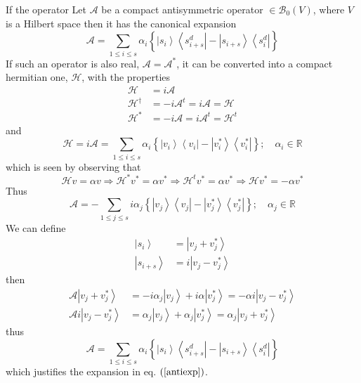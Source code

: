 \documentclass[aps,preprint]{revtex4}%
\begin{document}
If the operator Let $\mathcal{A}$ be a compact antisymmetric operator
$\in\mathcal{B}_{0}\left(  V\right)  $, where $V$ is a Hilbert space then it
has the canonical expansion
\begin{equation}
\mathcal{A}=\sum_{1\leq i\leq s}\alpha_{i}\left\{  \left\vert s_{i}%
\right\rangle \left\langle s_{i+s}^{d}\right\vert -\left\vert s_{i+s}%
\right\rangle \left\langle s_{i}^{d}\right\vert \right\}  \label{antiexp}%
\end{equation}
If such an operator is also real, $\mathcal{A}=\mathcal{A}^{\ast}$, it can be
converted into a compact hermitian one, $\mathcal{H}$, with the properties
\begin{align}
\mathcal{H}  & =i\mathcal{A}\nonumber\\
\mathcal{H}^{\dagger}  & =-i\mathcal{A}^{t}=i\mathcal{A}=\mathcal{H}%
\nonumber\\
\mathcal{H}^{\ast}  & =-i\mathcal{A}=i\mathcal{A}^{t}=\mathcal{H}^{t}%
\end{align}
and
\begin{equation}
\mathcal{H}=i\mathcal{A}=\sum_{1\leq i\leq s}\alpha_{i}\left\{  \left\vert
v_{i}\right\rangle \left\langle v_{i}\right\vert -\left\vert v_{i}^{\ast
}\right\rangle \left\langle v_{i}^{\ast}\right\vert \right\}  ;\quad\alpha
_{i}\in\mathbb{R}%
\end{equation}
which is seen by observing that
\begin{equation}
\mathcal{H}v=\alpha v\Rightarrow\mathcal{H}^{\ast}v^{\ast}=\alpha v^{\ast
}\Rightarrow\mathcal{H}^{t}v^{\ast}=\alpha v^{\ast}\Rightarrow\mathcal{H}%
v^{\ast}=-\alpha v^{\ast}%
\end{equation}
Thus
\begin{equation}
\mathcal{A}=-\sum_{1\leq j\leq s}i\alpha_{j}\left\{  \left\vert v_{j}%
\right\rangle \left\langle v_{j}\right\vert -\left\vert v_{j}^{\ast
}\right\rangle \left\langle v_{j}^{\ast}\right\vert \right\}  ;\quad\alpha
_{j}\in\mathbb{R}%
\end{equation}
We can define
\begin{align}
\left\vert s_{i}\right\rangle  & =\left\vert v_{j}+v_{j}^{\ast}\right\rangle
\nonumber\\
\left\vert s_{i+s}\right\rangle  & =i\left\vert v_{j}-v_{j}^{\ast
}\right\rangle
\end{align}
then
\begin{align}
\mathcal{A}\left\vert v_{j}+v_{j}^{\ast}\right\rangle  & =-i\alpha
_{j}\left\vert v_{j}\right\rangle +i\alpha\left\vert v_{j}^{\ast}\right\rangle
=-\alpha i\left\vert v_{j}-v_{j}^{\ast}\right\rangle \nonumber\\
\mathcal{A}i\left\vert v_{j}-v_{j}^{\ast}\right\rangle  & =\alpha
_{j}\left\vert v_{j}\right\rangle +\alpha_{j}\left\vert v_{j}^{\ast
}\right\rangle =\alpha_{j}\left\vert v_{j}+v_{j}^{\ast}\right\rangle
\end{align}
thus
\begin{equation}
\mathcal{A=}\sum_{1\leq i\leq s}\alpha_{i}\left\{  \left\vert s_{i}%
\right\rangle \left\langle s_{i+s}^{d}\right\vert -\left\vert s_{i+s}%
\right\rangle \left\langle s_{i}^{d}\right\vert \right\}
\end{equation}
which justifies the expansion in eq. $\left(  \ref{antiexp}\right)  $.
\end{document}
